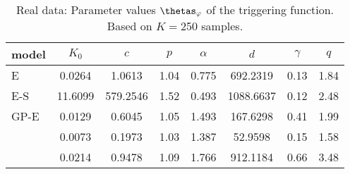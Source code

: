 \begin{table}[h!]
\centering
\small
\caption{Real data: Parameter values $\thetas_{\varphi}$ of the triggering function. Based on $K=$250 samples.}
\begin{tabular}{lccccccc}
\hline
model & $K_0$ & $c$ & $p$ & $\alpha$ & $d$ & $\gamma$ & $q$  \\ \hline
E & 0.0264 & 1.0613 & 1.04 & 0.775 & 692.2319  & 0.13   & 1.84 \\ \hline
E-S  & 11.6099 & 579.2546 & 1.52 & 0.493 & 1088.6637  & 0.12   & 2.48 \\ \hline
GP-E  & 0.0129 & 0.6045 & 1.05 & 1.493 & 167.6298  & 0.41   & 1.99 \\ 
  & 0.0073 & 0.1973 & 1.03 & 1.387 & 52.9598  & 0.15   & 1.58 \\ 
 & 0.0214 & 0.9478 & 1.09 & 1.766 & 912.1184  & 0.66   & 3.48 \\ \hline

\end{tabular}
\end{table}
